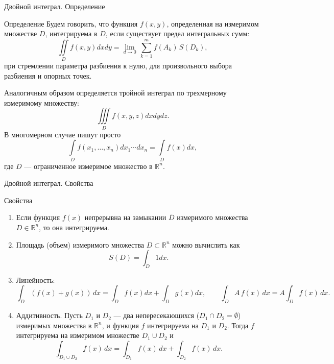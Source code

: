 \documentclass[8pt]{beamer}
\begin{document}

\begin{frame}{Двойной интеграл. Определение}
\begin{block}{Определение}
Будем говорить, что функция $f(x,y)$, определенная на измеримом множестве $D$, интегрируема в $D$, если  существует предел интегральных сумм:
$$\iint\limits_D f(x,y)dxdy = \lim_{d\to 0}\, \sum_{k=1}^m f(A_k)\, S(D_k),$$
при стремлении параметра разбиения к нулю, для произвольного выбора разбиения и опорных точек.
\end{block}
Аналогичным образом определяется тройной интеграл по трехмерному измеримому множеству:
$$\iiint\limits_D f(x,y,z)dxdydz.$$
В многомерном случае пишут просто
$$\int\limits_D f(x_1,\ldots,x_n)dx_1\cdots dx_n = \int\limits_D f(x) dx,$$
где $D$ --- ограниченное измеримое множество в $\mathbb{R}^n$.
\end{frame}

\begin{frame}{Двойной интеграл. Свойства}
\begin{block}{Свойства}
\begin{enumerate}
\item Если функция $f(x)$ непрерывна на замыкании $\overline{D}$ измеримого множества $D\in\mathbb{R}^n$, то она интегрируема.
\item Площадь (объем) измеримого множества $D\subset\mathbb{R}^n$ можно вычислить как
$$S(D) = \int_D 1dx.$$
\item Линейность:
$$\int_D \left( f(x)+g(x)\right) \, dx = \int_D f(x)dx+\int_D g(x)dx,\qquad \int_D A\, f(x)\,dx = A\int_D f(x)\,dx. $$
\item Аддитивность. Пусть $D_1$ и $D_2$ --- два непересекающихся ($D_1\cap D_2 = \emptyset$) измеримых множества в $\mathbb{R}^n$, и функция $f$ интегрируема на $D_1$ и $D_2$. Тогда $f$ интегрируема на измеримом множестве $D_1\cup D_2$ и 
$$\int_{D_1\cup D_2}f(x)\,dx = \int_{D_1} f(x)\,dx+\int_{D_2}f(x)\,dx.$$
\end{enumerate}
\end{block}
\end{frame}
\end{document}
